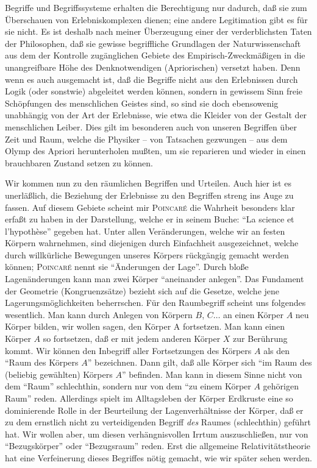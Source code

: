 
Begriffe und Begriffssysteme erhalten die Berechtigung nur dadurch, daß sie zum 
Überschauen von Erlebniskomplexen dienen; eine andere Legitimation gibt es für 
sie nicht. Es ist deshalb nach meiner Überzeugung einer der verderblichsten 
Taten der Philosophen, daß sie gewisse begriffliche Grundlagen der 
Naturwissenschaft aus dem der Kontrolle zugänglichen Gebiete des 
Empirisch-Zweckmäßigen in die unangreifbare Höhe des Denknotwendigen 
(Apriorischen) versetzt haben. Denn wenn es auch ausgemacht ist, daß die 
Begriffe nicht aus den Erlebnissen durch Logik (oder sonstwie) abgeleitet werden 
können, sondern in gewissem Sinn freie Schöpfungen des menschlichen Geistes 
sind, so sind sie doch ebensowenig unabhängig von der Art der Erlebnisse, wie 
etwa die Kleider von der Gestalt der menschlichen Leiber. Dies gilt im 
besonderen auch von unseren Begriffen über Zeit und Raum, welche die Physiker -- 
von Tatsachen gezwungen -- aus dem Olymp des Apriori herunterholen mußten, um 
sie reparieren und wieder in einen brauchbaren Zustand setzen zu können.

Wir kommen nun zu den räumlichen Begriffen und Urteilen. Auch hier ist es 
unerläßlich, die Beziehung der Erlebnisse zu den Begriffen streng ins Auge zu 
fassen. Auf diesem Gebiete scheint mir 
\textsc{Poincar\'e} die Wahrheit besonders klar 
erfaßt zu haben in der Darstellung, welche er in seinem Buche: \enquote{La 
science et l'hypothèse} gegeben hat. Unter allen Veränderungen, welche wir an 
festen Körpern wahrnehmen, sind diejenigen durch Einfachheit ausgezeichnet, 
welche durch willkürliche Bewegungen unseres Körpers rückgängig gemacht werden 
können; \textsc{Poincar\'e} nennt sie 
\enquote{Änderungen der Lage}. Durch bloße Lagenänderungen kann man zwei Körper 
\enquote{aneinander anlegen}. Das Fundament der Geometrie (Kongruenzsätze) 
bezieht sich auf die Gesetze, welche jene Lagerungsmöglichkeiten beherrschen. 
Für den Raumbegriff scheint uns folgendes wesentlich. Man kann durch Anlegen von 
Körpern $B$, $C \ldots$ an einen Körper $A$ neu Körper bilden, wir wollen sagen, 
den Körper A fortsetzen. Man kann einen Körper $A$ so fortsetzen, daß er mit 
jedem anderen Körper $X$ zur Berührung kommt. Wir können den Inbegriff aller 
Fortsetzungen des Körpers $A$ als den \enquote{Raum des Körpers $A$} bezeichnen. 
Dann gilt, daß alle Körper sich \enquote{im Raum des (beliebig gewählten) 
Körpers $A$} befinden. Man kann in diesem Sinne nicht von dem \enquote{Raum} 
schlechthin, sondern nur von dem \enquote{zu einem Körper $A$ gehörigen Raum} 
reden. Allerdings spielt im Alltagsleben der Körper Erdkruste eine so 
dominierende Rolle in der Beurteilung der Lagenverhältnisse der Körper, daß er 
zu dem ernstlich nicht zu verteidigenden Begriff \emph{des} Raumes (schlechthin) 
geführt hat. Wir wollen aber, um diesen verhängnisvollen Irrtum auszuschließen, 
nur von \enquote{Bezugskörper} oder \enquote{Bezugsraum} reden. Erst die 
allgemeine Relativitätstheorie hat eine Verfeinerung dieses Begriffes nötig 
gemacht, wie wir später sehen werden.

